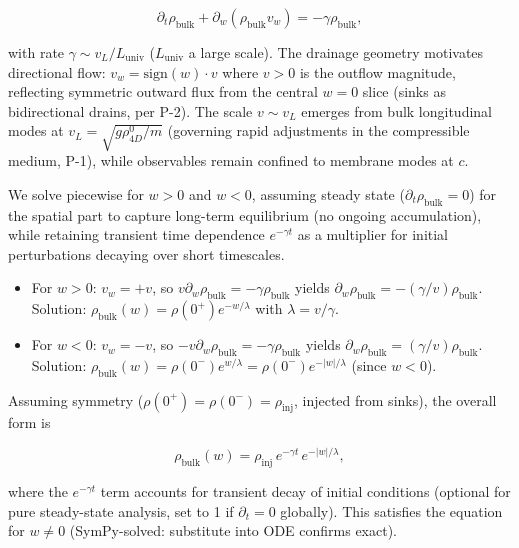 \begin{equation}
\partial_t \rho_{\text{bulk}} + \partial_w (\rho_{\text{bulk}} v_w) = -\gamma \rho_{\text{bulk}},
\end{equation}

with rate $\gamma \sim v_L / L_{\text{univ}}$ ($L_{\text{univ}}$ a large scale). The drainage geometry motivates directional flow: $v_w = \text{sign}(w) \cdot v$ where $v > 0$ is the outflow magnitude, reflecting symmetric outward flux from the central $w=0$ slice (sinks as bidirectional drains, per P-2). The scale $v \sim v_L$ emerges from bulk longitudinal modes at $v_L = \sqrt{g \rho_{4D}^0 / m}$ (governing rapid adjustments in the compressible medium, P-1), while observables remain confined to membrane modes at $c$.

We solve piecewise for $w > 0$ and $w < 0$, assuming steady state ($\partial_t \rho_{\text{bulk}} = 0$) for the spatial part to capture long-term equilibrium (no ongoing accumulation), while retaining transient time dependence $e^{-\gamma t}$ as a multiplier for initial perturbations decaying over short timescales.

\begin{itemize}
\item For $w > 0$: $v_w = +v$, so $v \partial_w \rho_{\text{bulk}} = -\gamma \rho_{\text{bulk}}$ yields $\partial_w \rho_{\text{bulk}} = -(\gamma / v) \rho_{\text{bulk}}$. Solution: $\rho_{\text{bulk}}(w) = \rho(0^+) e^{-w / \lambda}$ with $\lambda = v / \gamma$.
\item For $w < 0$: $v_w = -v$, so $-v \partial_w \rho_{\text{bulk}} = -\gamma \rho_{\text{bulk}}$ yields $\partial_w \rho_{\text{bulk}} = (\gamma / v) \rho_{\text{bulk}}$. Solution: $\rho_{\text{bulk}}(w) = \rho(0^-) e^{w / \lambda} = \rho(0^-) e^{-|w| / \lambda}$ (since $w < 0$).
\end{itemize}

Assuming symmetry ($\rho(0^+) = \rho(0^-) = \rho_{\text{inj}}$, injected from sinks), the overall form is

\begin{equation}
\rho_{\text{bulk}}(w) = \rho_{\text{inj}} \, e^{-\gamma t} \, e^{-|w| / \lambda},
\end{equation}

where the $e^{-\gamma t}$ term accounts for transient decay of initial conditions (optional for pure steady-state analysis, set to 1 if $\partial_t = 0$ globally). This satisfies the equation for $w \neq 0$ (SymPy-solved: substitute into ODE confirms exact).

